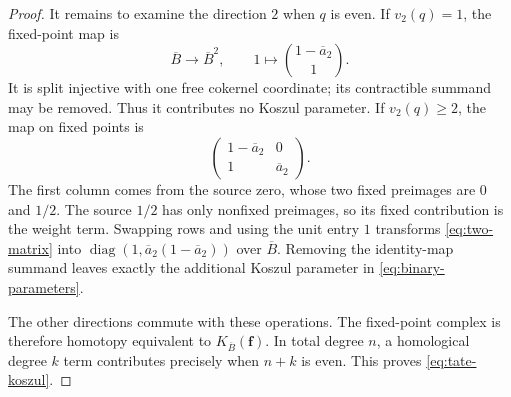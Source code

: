 \documentclass[11pt]{article}
\numberwithin{equation}{section}
\theoremstyle{definition}
\theoremstyle{remark}
\begin{document}
\begin{proof}
It remains to examine the direction $2$ when $q$ is even. If $v_2(q)=1$,
the fixed-point map is
\[
 \overline B\longrightarrow\overline B^2,\qquad
 1\longmapsto\binom{1-\overline a_2}{1}.
\]
It is split injective with one free cokernel coordinate; its contractible
summand may be removed. Thus it contributes no Koszul parameter.
If $v_2(q)\ge2$, the map on fixed points is
\begin{equation}
 \begin{pmatrix}
 1-\overline a_2&0\\
 1&\overline a_2
 \end{pmatrix}.
 \label{eq:two-matrix}
\end{equation}
The first column comes from the source zero, whose two fixed preimages
are $0$ and $1/2$. The source $1/2$ has only nonfixed preimages, so its
fixed contribution is the weight term. Swapping rows and using the
unit entry $1$ transforms \eqref{eq:two-matrix} into
$\operatorname{diag}(1,\overline a_2(1-\overline a_2))$ over
$\overline B$. Removing the identity-map summand leaves exactly the
additional Koszul parameter in \eqref{eq:binary-parameters}.

The other directions commute with these operations. The fixed-point
complex is therefore homotopy equivalent to
$K_{\overline B}(\boldsymbol f)$. In total degree $n$, a homological
degree $k$ term contributes precisely when $n+k$ is even. This proves
\eqref{eq:tate-koszul}.
\end{proof}
\end{document}
